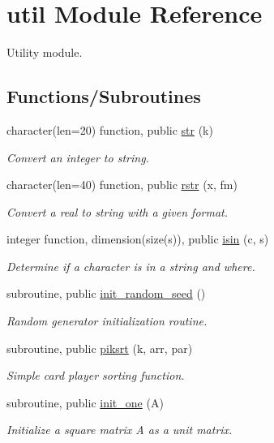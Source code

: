 \hypertarget{namespaceutil}{}\section{util Module Reference}
\label{namespaceutil}


Utility module.  


\subsection*{Functions/\+Subroutines}
\begin{DoxyCompactItemize}
\item 
character(len=20) function, public \hyperlink{namespaceutil_a1df36d0696c9183ceb6bb770f1d88111}{str} (k)
\begin{DoxyCompactList}\small\item\em Convert an integer to string. \end{DoxyCompactList}\item 
character(len=40) function, public \hyperlink{namespaceutil_ac1630658a46867b1f7255eaa51198bf3}{rstr} (x, fm)
\begin{DoxyCompactList}\small\item\em Convert a real to string with a given format. \end{DoxyCompactList}\item 
integer function, dimension(size(s)), public \hyperlink{namespaceutil_a1e2cd46baa2070e28949e28c8a3e037e}{isin} (c, s)
\begin{DoxyCompactList}\small\item\em Determine if a character is in a string and where. \end{DoxyCompactList}\item 
subroutine, public \hyperlink{namespaceutil_a3c2dcf05b068a55f0066d2b393e75dc7}{init\+\_\+random\+\_\+seed} ()
\begin{DoxyCompactList}\small\item\em Random generator initialization routine. \end{DoxyCompactList}\item 
subroutine, public \hyperlink{namespaceutil_af8d0a8ec8cb7391ddbf455dc92f2189d}{piksrt} (k, arr, par)
\begin{DoxyCompactList}\small\item\em Simple card player sorting function. \end{DoxyCompactList}\item 
subroutine, public \hyperlink{namespaceutil_aca7f2465fedb87fef954d8f0c30668c7}{init\+\_\+one} (A)
\begin{DoxyCompactList}\small\item\em Initialize a square matrix A as a unit matrix. \end{DoxyCompactList}\end{DoxyCompactItemize}


